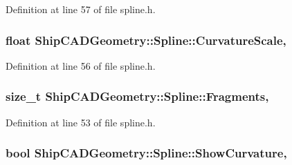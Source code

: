 Definition at line 57 of file spline.\-h.

\hypertarget{classShipCADGeometry_1_1Spline_a2f9eb570f1bfe818d966a40cd0733df2}{
\subsubsection[{Curvature\-Scale}]{\setlength{\rightskip}{0pt plus 5cm}float Ship\-C\-A\-D\-Geometry\-::\-Spline\-::\-Curvature\-Scale\hspace{0.3cm}{\ttfamily [read]}, {\ttfamily [write]}}}\label{classShipCADGeometry_1_1Spline_a2f9eb570f1bfe818d966a40cd0733df2}


Definition at line 56 of file spline.\-h.

\hypertarget{classShipCADGeometry_1_1Spline_a964d9e0dcb98962d920dd5e595598a42}{
\subsubsection[{Fragments}]{\setlength{\rightskip}{0pt plus 5cm}size\-\_\-t Ship\-C\-A\-D\-Geometry\-::\-Spline\-::\-Fragments\hspace{0.3cm}{\ttfamily [read]}, {\ttfamily [write]}}}\label{classShipCADGeometry_1_1Spline_a964d9e0dcb98962d920dd5e595598a42}


Definition at line 53 of file spline.\-h.

\hypertarget{classShipCADGeometry_1_1Spline_ad4357d84fc550cf73581a303f7bd9088}{
\subsubsection[{Show\-Curvature}]{\setlength{\rightskip}{0pt plus 5cm}bool Ship\-C\-A\-D\-Geometry\-::\-Spline\-::\-Show\-Curvature\hspace{0.3cm}{\ttfamily [read]}, {\ttfamily [write]}}}\label{classShipCADGeometry_1_1Spline_ad4357d84fc550cf73581a303f7bd9088}


